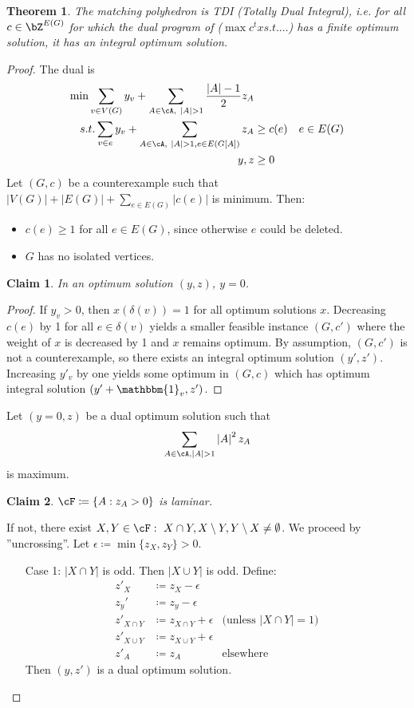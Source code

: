 \documentclass[11pt, a4paper]{article}
\newcommand{\abs}[1]{\left\lvert#1\right\rvert}
\newcommand{\set}[1]{\{#1\}}
\newtheorem{theorem}{Theorem}[section]
\newtheorem*{claim}{Claim}
\theoremstyle{remark}
\theoremstyle{definition}
\begin{document}
\begin{theorem}
	The matching polyhedron is TDI (Totally Dual Integral), i.e. for all
	$c\in \bZ^{E(G)}$ for which the dual program of ($\max c^tx s.t.\ldots$)
	has a finite optimum solution, it has an integral optimum solution.
\end{theorem}
\begin{proof}
	The dual is
	\begin{align*}
		\min \sum_{v\in V(G)}y_v+\sum_{A\in\cA,\ \abs{A}>1}\frac{\abs{A}-1}{2}z_A \\
		s.t.\sum_{v\in e}y_v
		+\sum_{A\in\cA,\ \abs{A}>1,e\in E(G[A])}z_A & \geq c(e) & e\in E(G)       \\
		y,z                                         & \geq0
	\end{align*}
	Let $(G,c)$ be a counterexample such that  $\abs{V(G)}+\abs{E(G)}+
		\sum_{e\in E(G)}\abs{c(e)}$ is minimum. Then:
	\begin{itemize}
		\item $c(e)\geq 1$ for all
		$e\in E(G)$, since otherwise $e$ could be deleted.
		\item $G$ has no isolated vertices.
	\end{itemize}
	\begin{claim}
		In an optimum solution $(y,z)$, $y=0$.
	\end{claim}
	\begin{proof}
		If $y_v>0$, then $x(\delta(v))=1$ for all optimum solutions $x$. Decreasing
		$c(e)$ by 1 for all $e\in\delta(v)$ yields a smaller feasible instance
		$(G,c')$ where the weight of $x$ is decreased by 1 and $x$ remains optimum.
		By assumption, $(G,c')$ is not a counterexample, so there exists an integral
		optimum solution $(y',z')$. Increasing $y'_v$ by one yields some optimum
		in $(G,c)$ which has optimum integral solution $(y'+\mathbbm{1}_v,z')$.
	\end{proof}

	Let $(y=0,z)$ be a dual optimum solution such that
	\[\sum_{A\in\cA, \abs{A}>1} \abs{A}^2z_A\]
	is maximum.
	\begin{claim}
		$\cF\coloneqq\set{A: z_A>0}$ is laminar.
	\end{claim}
	If not, there exist $X,Y\in\cF:\ X\cap Y,X\setminus Y,Y\setminus X\neq\emptyset$.
	We proceed by ''uncrossing''. Let $\epsilon\coloneqq \min\set{z_X,z_Y}>0$.
	\begin{enumerate}
		\item[Case 1:] $\abs{X\cap Y}$ is odd. Then $\abs{X\cup Y}$ is odd. Define:
		\begin{align*}
			z'_X         & \coloneqq z_X-\epsilon                                             \\
			z_y'         & \coloneqq z_y-\epsilon                                             \\
			z'_{X\cap Y} & \coloneqq z_{X\cap Y}+\epsilon & \text{(unless $\abs{X\cap Y}=1$)} \\
			z'_{X\cup Y} & \coloneqq z_{X\cup Y}+\epsilon                                     \\
			z'_A         & \coloneqq z_A                  & \text{elsewhere}
		\end{align*}
		Then $(y,z')$ is a dual optimum solution.


\end{enumerate}
\end{proof}
\end{document}
